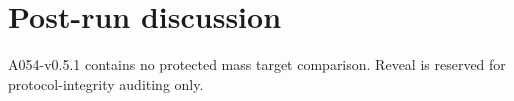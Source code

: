 \section*{Post-run discussion}
A054-v0.5.1 contains no protected mass target comparison. Reveal is reserved for protocol-integrity auditing only.

